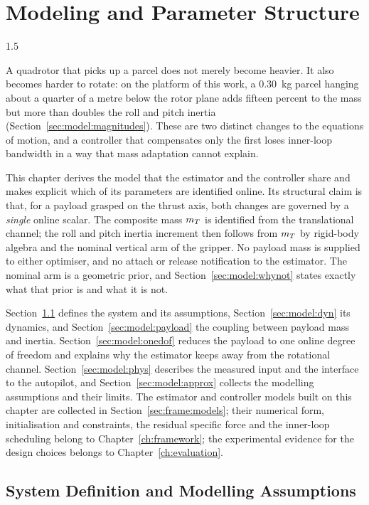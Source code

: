 \chapter{Modeling and Parameter Structure}
\label{ch:model}
\begin{spacing}{1.5}
\setlength{\parskip}{0.22in}

A quadrotor that picks up a parcel does not merely become heavier. It also
becomes harder to rotate: on the platform of this work, a \SI{0.30}{\kg} parcel
hanging about a quarter of a metre below the rotor plane adds fifteen percent to
the mass but more than doubles the roll and pitch inertia
(Section~\ref{sec:model:magnitudes}). These are two distinct changes to the
equations of motion, and a controller that compensates only the first loses
inner-loop bandwidth in a way that mass adaptation cannot explain.

This chapter derives the model that the estimator and the controller share and
makes explicit which of its parameters are identified online. Its structural
claim is that, for a payload grasped on the thrust axis, both changes are
governed by a \emph{single} online scalar. The composite mass $m_T$ is
identified from the translational channel; the roll and pitch inertia increment
then follows from $m_T$ by rigid-body algebra and the nominal vertical arm of
the gripper. No payload mass is supplied to either optimiser, and no attach or
release notification to the estimator. The nominal arm is a geometric prior, and
Section~\ref{sec:model:whynot} states exactly what that prior is and what it is
not.

Section~\ref{sec:model:frames} defines the system and its assumptions,
Section~\ref{sec:model:dyn} its dynamics, and Section~\ref{sec:model:payload}
the coupling between payload mass and inertia. Section~\ref{sec:model:onedof}
reduces the payload to one online degree of freedom and explains why the
estimator keeps away from the rotational channel. Section~\ref{sec:model:phys}
describes the measured input and the interface to the autopilot, and
Section~\ref{sec:model:approx} collects the modelling assumptions and their
limits. The estimator and controller models built on this chapter are collected
in Section~\ref{sec:frame:models}; their numerical form, initialisation and
constraints, the residual specific force and the inner-loop scheduling belong to
Chapter~\ref{ch:framework}; the
experimental evidence for the design choices belongs to
Chapter~\ref{ch:evaluation}.

\section{System Definition and Modelling Assumptions}\label{sec:model:frames}


\end{spacing}
